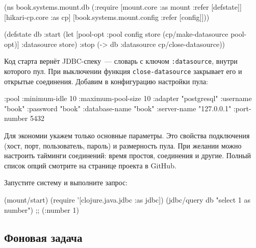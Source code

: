 \else

\begin{english}
  \begin{clojure}
(ns book.systems.mount.db
  (:require
   [mount.core :as mount :refer [defstate]]
   [hikari-cp.core :as cp]
   [book.systems.mount.config :refer [config]]))

(defstate db
  :start
  (let [{pool-opt :pool} config
        store (cp/make-datasource pool-opt)]
    {:datasource store})
  :stop
  (-> db :datasource cp/close-datasource))
  \end{clojure}
\end{english}

\fi


Код старта вернёт JDBC-спеку~--- словарь с ключом \verb|:datasource|, внутри
которого пул. При выключении функция \verb|close-datasource| закрывает его и
открытые соединения. Добавим в конфигурацию настройки пула:

\begin{english}
  \begin{clojure}
{:pool {:minimum-idle       10
        :maximum-pool-size  10
        :adapter            "postgresql"
        :username           "book"
        :password           "book"
        :database-name      "book"
        :server-name        "127.0.0.1"
        :port-number        5432}}
  \end{clojure}
\end{english}

Для экономии укажем только основные параметры. Это свойства подключения (хост,
порт, пользователь, пароль) и размерность пула. При желании можно настроить
тайминги соединений: время простоя, соединения и другие. Полный список опций
смотрите на странице проекта в GitHub.

Запустите систему и выполните запрос:

\begin{english}
  \begin{clojure}
(mount/start)
(require '[clojure.java.jdbc :as jdbc])
(jdbc/query db "select 1 as number")
;; ({:number 1})
  \end{clojure}
\end{english}

\subsection{Фоновая задача}

\label{worker}

